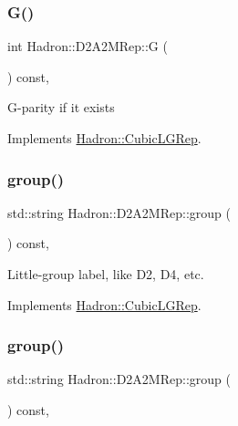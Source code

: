 \subsubsection{\texorpdfstring{G()}{G()}\hspace{0.1cm}{\footnotesize\ttfamily [2/2]}}
{\footnotesize\ttfamily int Hadron\+::\+D2\+A2\+M\+Rep\+::G (\begin{DoxyParamCaption}{ }\end{DoxyParamCaption}) const\hspace{0.3cm}{\ttfamily [inline]}, {\ttfamily [virtual]}}

G-\/parity if it exists 

Implements \mbox{\hyperlink{structHadron_1_1CubicLGRep_ace26f7b2d55e3a668a14cb9026da5231}{Hadron\+::\+Cubic\+L\+G\+Rep}}.

\mbox{\label{structHadron_1_1D2A2MRep_a93c34b277f64808d5863a7b292bbb888}} 
\subsubsection{\texorpdfstring{group()}{group()}\hspace{0.1cm}{\footnotesize\ttfamily [1/2]}}
{\footnotesize\ttfamily std\+::string Hadron\+::\+D2\+A2\+M\+Rep\+::group (\begin{DoxyParamCaption}{ }\end{DoxyParamCaption}) const\hspace{0.3cm}{\ttfamily [inline]}, {\ttfamily [virtual]}}

Little-\/group label, like D2, D4, etc. 

Implements \mbox{\hyperlink{structHadron_1_1CubicLGRep_a9bdb14b519a611d21379ed96a3a9eb41}{Hadron\+::\+Cubic\+L\+G\+Rep}}.

\mbox{\label{structHadron_1_1D2A2MRep_a93c34b277f64808d5863a7b292bbb888}} 
\subsubsection{\texorpdfstring{group()}{group()}\hspace{0.1cm}{\footnotesize\ttfamily [2/2]}}
{\footnotesize\ttfamily std\+::string Hadron\+::\+D2\+A2\+M\+Rep\+::group (\begin{DoxyParamCaption}{ }\end{DoxyParamCaption}) const\hspace{0.3cm}{\ttfamily [inline]}, {\ttfamily [virtual]}}

